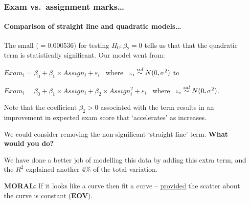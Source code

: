 \documentclass{beamer}\usepackage[]{graphicx}\usepackage[]{xcolor}
\begin{document}
\begin{frame}[ fragile]
\frametitle{Exam vs.\ assignment marks\ldots}
\framesubtitle{Comparison of straight line and quadratic models\ldots}

The small \pval{} $(=0.000536$) for testing $H_0: \beta_2=0$ tells us that that the quadratic term is statistically significant. 
Our model went from:

\medskip
$ Exam_i =\beta_0+\beta_1\times Assign_i +\varepsilon_i$  ~where~ $\varepsilon_i \stackrel{iid}{\sim} N(0,\sigma^2)$ to

\medskip 

$ Exam_i =\beta_0+\beta_1\times Assign_i +\beta_2\times Assign_i^2 + \varepsilon_i$ ~where~ $\varepsilon_i \stackrel{iid}{\sim} N(0,\sigma^2)$.

\medskip 
Note that the coefficient $\beta_2>0$ associated with the  term
results in an improvement in expected exam score that `accelerates' as  increases.

\medskip 
We could consider removing the non-significant `straight line'  term. 
\textbf{What would you do?}

\medskip 

We have done a better job of modelling this data by adding this extra term, and the $R^2$ explained another 4\% of the total variation.

\medskip 
\textbf{MORAL:} If it looks like a curve  then  fit a curve  --  \underline{provided} the scatter about the curve is constant (\textbf{EOV}).

\end{frame}



\end{document}
